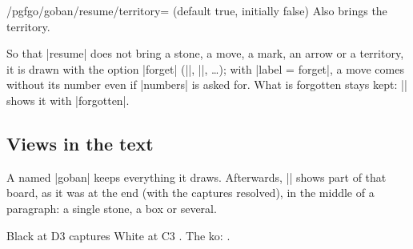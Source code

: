 	\begin{key}{/pgfgo/goban/resume/territory= (default true, initially false)}
		Also brings the territory.

		\begin{codeexample}[]

			\begin{goban}[name = saved]
			\end{goban}

			\begin{goban}[resume = saved]
			\end{goban}

			\begin{goban}[resume = {saved, numbers, marks, territory}]
			\end{goban}
		\end{codeexample}
	\end{key}

	So that |resume| does not bring a stone, a move, a mark, an arrow or a territory, it is drawn with the option |forget| (||, ||, \ldots); with |label = forget|, a move comes without its number even if |numbers| is asked for. What is forgotten stays kept: |\pgfgoview| shows it with |forgotten|.

	\subsection{Views in the text}
	\label{subsec:vistas}
	A named |goban| keeps everything it draws. Afterwards, |\pgfgoview| shows part of that board, as it was at the end (with the captures resolved), in the middle of a paragraph: a single stone, a box or several.

	\begin{codeexample}[]
		\begin{goban}[5, name = board1, captures]
		\end{goban}

		Black at D3  captures White at C3 .
		The ko: .
	\end{codeexample}

